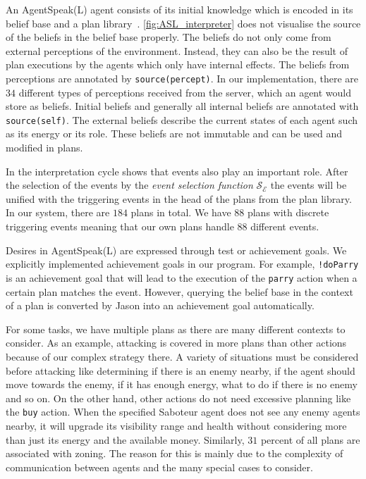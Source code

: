 An AgentSpeak(L) agent consists of its initial knowledge which is encoded in its belief base and a plan library~\cite{rafael_BDIAgent_2005}.
\autoref{fig:ASL_interpreter} does not visualise the source of the beliefs in the belief base properly.
The beliefs do not only come from external perceptions of the environment. %
Instead, they can also be the result of plan executions by the agents which only have internal effects.
The beliefs from perceptions are annotated by \texttt{source(percept)}.
In our implementation, there are $34$ different types of perceptions received from the server, which an agent would store as beliefs.
Initial beliefs and generally all internal beliefs are annotated with \texttt{source(self)}.
The external beliefs describe the current states of each agent such as its energy or its role.
These beliefs are not immutable and can be used and modified in plans.

In the interpretation cycle shows that events also play an important role.
After the selection of the events by the \emph{event selection function} $\mathcal{S_E}$ the events will be unified with the triggering events in the head of the plans from the plan library.
In our system, there are $184$ plans in total.
We have $88$ plans with discrete triggering events meaning that our own plans handle $88$ different events.

Desires in AgentSpeak(L) are expressed through test or achievement goals.
We explicitly implemented achievement goals in our program.
For example, \texttt{!doParry} is an achievement goal that will lead to the execution of the \texttt{parry} action when a certain plan matches the event.
However, querying the belief base in the context of a plan is converted by Jason into an achievement goal automatically.

For some tasks, we have multiple plans as there are many different contexts to consider.
As an example, attacking is covered in more plans than other actions because of our complex strategy there.
A variety of situations must be considered before attacking like determining if there is an enemy nearby, if the agent should move towards the enemy, if it has enough energy, what to do if there is no enemy and so on.
On the other hand, other actions do not need excessive planning like the \texttt{buy} action.
When the specified Saboteur agent does not see any enemy agents nearby, it will upgrade its visibility range and health without considering more than just its energy and the available money.
Similarly, $31$ percent of all plans are associated with zoning.
The reason for this is mainly due to the complexity of communication between agents and the many special cases to consider.

